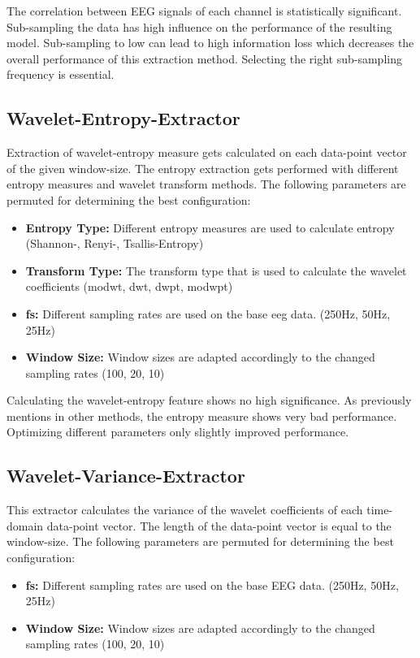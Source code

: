 \documentclass{article}
\begin{document}
The correlation between EEG signals of each channel is statistically significant. Sub-sampling the data has high influence on the performance of the resulting model. Sub-sampling to low can lead to high information loss which decreases the overall performance of this extraction method. Selecting the right sub-sampling frequency is essential. 

\subsection{Wavelet-Entropy-Extractor}
Extraction of wavelet-entropy measure gets calculated on each data-point vector of the given window-size. The entropy extraction gets performed with different entropy measures and wavelet transform methods. The following parameters are permuted for determining the best configuration:

\begin{itemize}
    \item \textbf{Entropy Type:} Different entropy measures are used to calculate entropy (Shannon-, Renyi-, Tsallis-Entropy)
    \item \textbf{Transform Type:} The transform type that is used to calculate the wavelet coefficients (modwt, dwt, dwpt, modwpt)
    \item \textbf{fs:} Different sampling rates are used on the base eeg data. (250Hz, 50Hz, 25Hz)
    \item \textbf{Window Size:} Window sizes are adapted accordingly to the changed sampling rates (100, 20, 10)
\end{itemize}

Calculating the wavelet-entropy feature shows no high significance. As previously mentions in other methods, the entropy measure shows very bad performance. Optimizing different parameters only slightly improved performance. 

\subsection{Wavelet-Variance-Extractor}
This extractor calculates the variance of the wavelet coefficients of each time-domain data-point vector. The length of the data-point vector is equal to the window-size. The following parameters are permuted for determining the best configuration: 
\begin{itemize}
    \item \textbf{fs:} Different sampling rates are used on the base EEG data. (250Hz, 50Hz, 25Hz)
    \item \textbf{Window Size:} Window sizes are adapted accordingly to the changed sampling rates (100, 20, 10)
\end{itemize}
\end{document}
